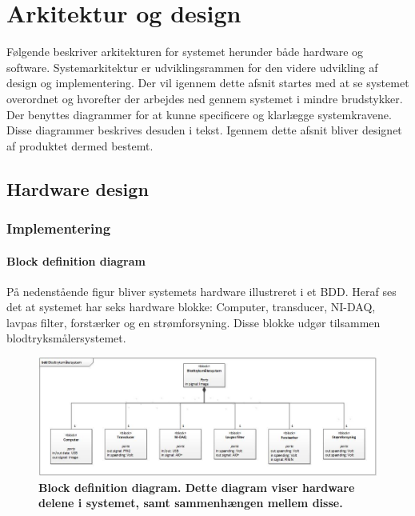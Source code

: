 \chapter{Arkitektur og design}
Følgende beskriver arkitekturen for systemet herunder både hardware og software. 
Systemarkitektur er udviklingsrammen for den videre udvikling af design og implementering. Der vil igennem dette afsnit startes med at se systemet overordnet og hvorefter der arbejdes ned gennem systemet i mindre brudstykker. Der benyttes diagrammer for at kunne specificere og klarlægge systemkravene. Disse diagrammer beskrives desuden i tekst. Igennem dette afsnit bliver designet af produktet dermed bestemt.
\section{Hardware design}
\subsection{Implementering}
\subsubsection{Block definition diagram}
På nedenstående figur bliver systemets hardware illustreret i et BDD. Heraf ses det at systemet har seks hardware blokke: Computer, transducer, NI-DAQ, lavpas filter, forstærker og en strømforsyning. Disse blokke udgør tilsammen blodtryksmålersystemet.
\begin{figure}[H]
\includegraphics[width =1.0\textwidth , center]{billeder/BDD}
\caption{\textbf{Block definition diagram. Dette diagram viser hardware delene i systemet, samt sammenhængen mellem disse.}}
\end{figure}
